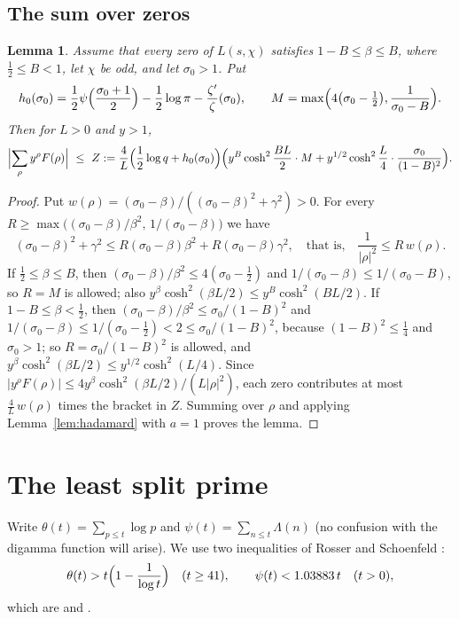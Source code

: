 \documentclass[11pt]{amsart}
\newtheorem{lemma}[theorem]{Lemma}
\theoremstyle{definition}
\theoremstyle{remark}
\numberwithin{equation}{section}
\begin{document}
\subsection{The sum over zeros}

\begin{lemma}\label{lem:zeros}
Assume that every zero of $L(s,\chi)$ satisfies $1-B\le\beta\le B$, where $\tfrac12\le B<1$, let $\chi$ be odd, and let $\sigma_0>1$. Put
\[
h_0(\sigma_0)=\frac12\psi\Bigl(\frac{\sigma_0+1}2\Bigr)-\frac12\log\pi-\frac{\zeta'}{\zeta}(\sigma_0),\qquad M=\max\Bigl(4\bigl(\sigma_0-\tfrac12\bigr),\frac1{\sigma_0-B}\Bigr).
\]
Then for $L>0$ and $y>1$,
\[
\Bigl|\sum_\rho y^\rho F(\rho)\Bigr|\ \le\ Z:=\frac4L\Bigl(\frac12\log q+h_0(\sigma_0)\Bigr)\Bigl(y^B\cosh^2\frac{BL}2\cdot M+y^{1/2}\cosh^2\frac L4\cdot\frac{\sigma_0}{(1-B)^2}\Bigr).
\]
\end{lemma}

\begin{proof}
Put $w(\rho)=(\sigma_0-\beta)/((\sigma_0-\beta)^2+\gamma^2)>0$. For every $R\ge\max\bigl((\sigma_0-\beta)/\beta^2,\,1/(\sigma_0-\beta)\bigr)$ we have
\[
(\sigma_0-\beta)^2+\gamma^2\le R(\sigma_0-\beta)\beta^2+R(\sigma_0-\beta)\gamma^2,\quad\text{that is,}\quad \frac1{|\rho|^2}\le R\,w(\rho).
\]
If $\tfrac12\le\beta\le B$, then $(\sigma_0-\beta)/\beta^2\le4(\sigma_0-\frac12)$ and $1/(\sigma_0-\beta)\le1/(\sigma_0-B)$, so $R=M$ is allowed; also $y^\beta\cosh^2(\beta L/2)\le y^B\cosh^2(BL/2)$. If $1-B\le\beta<\tfrac12$, then $(\sigma_0-\beta)/\beta^2\le\sigma_0/(1-B)^2$ and $1/(\sigma_0-\beta)\le 1/(\sigma_0-\frac12)<2\le\sigma_0/(1-B)^2$, because $(1-B)^2\le\frac14$ and $\sigma_0>1$; so $R=\sigma_0/(1-B)^2$ is allowed, and $y^\beta\cosh^2(\beta L/2)\le y^{1/2}\cosh^2(L/4)$. Since $|y^\rho F(\rho)|\le 4y^\beta\cosh^2(\beta L/2)/(L|\rho|^2)$, each zero contributes at most $\frac4L\,w(\rho)$ times the bracket in $Z$. Summing over $\rho$ and applying Lemma~\ref{lem:hadamard} with $a=1$ proves the lemma.
\end{proof}

\section{The least split prime}\label{sec:proofA}

Write $\theta(t)=\sum_{p\le t}\log p$ and $\psi(t)=\sum_{n\le t}\Lambda(n)$ (no confusion with the digamma function will arise). We use two inequalities of Rosser and Schoenfeld \cite{RS62}:
\begin{equation}\label{eq:RS}
\theta(t)>t\Bigl(1-\frac1{\log t}\Bigr)\quad(t\ge41),\qquad \psi(t)<1.03883\,t\quad(t>0),
\end{equation}
which are \cite[(3.16)]{RS62} and \cite[Theorem 12]{RS62}.
\end{document}
